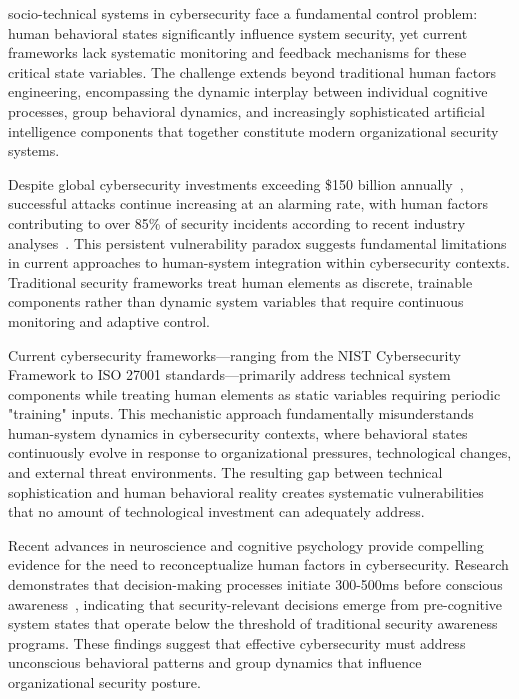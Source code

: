 \documentclass[journal]{IEEEtran}
\begin{document}
 socio-technical systems in cybersecurity face a fundamental control problem: human behavioral states significantly influence system security, yet current frameworks lack systematic monitoring and feedback mechanisms for these critical state variables. The challenge extends beyond traditional human factors engineering, encompassing the dynamic interplay between individual cognitive processes, group behavioral dynamics, and increasingly sophisticated artificial intelligence components that together constitute modern organizational security systems.

Despite global cybersecurity investments exceeding \$150 billion annually~\cite{gartner2023}, successful attacks continue increasing at an alarming rate, with human factors contributing to over 85\% of security incidents according to recent industry analyses~\cite{verizon2023}. This persistent vulnerability paradox suggests fundamental limitations in current approaches to human-system integration within cybersecurity contexts. Traditional security frameworks treat human elements as discrete, trainable components rather than dynamic system variables that require continuous monitoring and adaptive control.

Current cybersecurity frameworks—ranging from the NIST Cybersecurity Framework to ISO 27001 standards—primarily address technical system components while treating human elements as static variables requiring periodic "training" inputs. This mechanistic approach fundamentally misunderstands human-system dynamics in cybersecurity contexts, where behavioral states continuously evolve in response to organizational pressures, technological changes, and external threat environments. The resulting gap between technical sophistication and human behavioral reality creates systematic vulnerabilities that no amount of technological investment can adequately address.

Recent advances in neuroscience and cognitive psychology provide compelling evidence for the need to reconceptualize human factors in cybersecurity. Research demonstrates that decision-making processes initiate 300-500ms before conscious awareness~\cite{libet1983, soon2008}, indicating that security-relevant decisions emerge from pre-cognitive system states that operate below the threshold of traditional security awareness programs. These findings suggest that effective cybersecurity must address unconscious behavioral patterns and group dynamics that influence organizational security posture.
\end{document}
